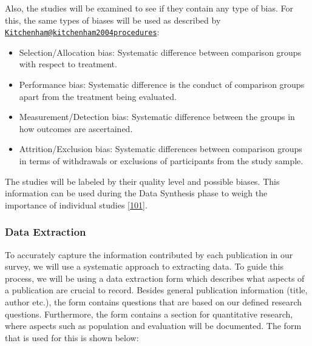 \documentclass[]{book}
\providecommand{\tightlist}{%
  \setlength{\itemsep}{0pt}\setlength{\parskip}{0pt}}
\begin{document}
Also, the studies will be examined to see if they contain any type of
bias. For this, the same types of biases will be used as described by
\href{mailto:Kitchenham@kitchenham2004procedures}{\nolinkurl{Kitchenham@kitchenham2004procedures}}:

\begin{itemize}
\tightlist
\item
  Selection/Allocation bias: Systematic difference between comparison
  groups with respect to treatment.
\item
  Performance bias: Systematic difference is the conduct of comparison
  groups apart from the treatment being evaluated.
\item
  Measurement/Detection bias: Systematic difference between the groups
  in how outcomes are ascertained.
\item
  Attrition/Exclusion bias: Systematic differences between comparison
  groups in terms of withdrawals or exclusions of participants from the
  study sample.
\end{itemize}

The studies will be labeled by their quality level and possible biases.
This information can be used during the Data Synthesis phase to weigh
the importance of individual studies
{[}\protect\hyperlink{ref-kitchenham2004procedures}{101}{]}.

\subsubsection{Data Extraction}\label{data-extraction}

To accurately capture the information contributed by each publication in
our survey, we will use a systematic approach to extracting data. To
guide this process, we will be using a data extraction form which
describes what aspects of a publication are crucial to record. Besides
general publication information (title, author etc.), the form contains
questions that are based on our defined research questions. Furthermore,
the form contains a section for quantitative research, where aspects
such as population and evaluation will be documented. The form that is
used for this is shown below:
\end{document}
